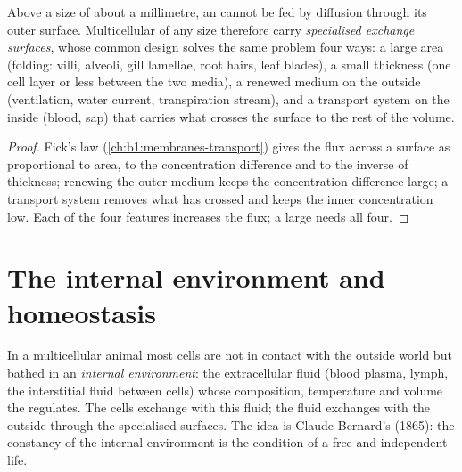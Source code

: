 \begin{proposition}\label{prop:b1:organism-environment:surfaces}
Above a size of about a millimetre, an  cannot be fed by
diffusion through its outer surface. Multicellular  of any size
therefore carry \emph{specialised exchange surfaces}, whose common design solves the same problem four ways: a large
area (folding: villi, alveoli, gill lamellae, root hairs, leaf
blades), a small thickness (one cell layer or less between the two
media), a renewed medium on the outside (ventilation, water current,
transpiration stream), and a transport system on the inside (blood,
sap) that carries what crosses the surface to the rest of the volume.
\end{proposition}
\begin{proof}
Fick's law (\cref{ch:b1:membranes-transport}) gives the flux across a
surface as proportional to area, to the concentration difference and to
the inverse of thickness; renewing the outer medium keeps the
concentration difference large; a transport system removes what has
crossed and keeps the inner concentration low. Each of the four features
increases the flux; a large  needs all four.
\end{proof}

\section{The internal environment and homeostasis}

\begin{definition}\label{def:b1:organism-environment:milieu}
In a multicellular animal most cells are not in contact with the outside
world but bathed in an \emph{internal environment}: the extracellular fluid (blood plasma, lymph, the
interstitial fluid between cells) whose composition, temperature and
volume the  regulates. The cells exchange with this fluid; the
fluid exchanges with the outside through the specialised surfaces. The
idea is Claude Bernard's (1865): the constancy of the internal
environment is the condition of a free and independent life.
\end{definition}

